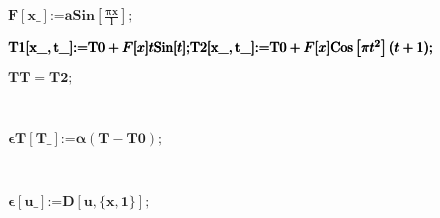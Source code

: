 \documentclass{article}
\newcommand{\unicode}[1]{{}}
\begin{document}
\begin{doublespace}
\noindent\(\pmb{\text{  }}\)
\end{doublespace}

\section*{$\unicode{041e}\unicode{043f}\unicode{0440}\unicode{0435}\unicode{0434}\unicode{0435}\unicode{043b}\unicode{0435}\unicode{043d}\unicode{0438}\unicode{0435}$
$\unicode{0432}\unicode{0441}\unicode{0435}\unicode{0445}$ $\unicode{043d}\unicode{0435}\unicode{043e}\unicode{0431}\unicode{0445}\unicode{043e}\unicode{0434}\unicode{0438}\unicode{043c}\unicode{044b}\unicode{0445}$
$\unicode{0444}\unicode{0443}\unicode{043d}\unicode{043a}\unicode{0446}\unicode{0438}\unicode{0439}$}

\begin{doublespace}
\noindent\(\pmb{F[\text{x$\_$}] \text{:=} a \text{Sin}\left[\frac{\pi  x}{l}\right];}\)
\end{doublespace}

\begin{doublespace}
\noindent\(\pmb{\text{T1}[\text{x$\_$}, \text{t$\_$}] \text{:=} \text{T0} + F[x]t \text{Sin}[t];}\\
\pmb{\text{T2}[ \text{x$\_$}, \text{t$\_$} ] \text{:=} \text{T0} + F[x] \text{Cos}\left[\pi  t^2\right](t+1);}\)
\end{doublespace}

\begin{doublespace}
\noindent\(\pmb{\text{TT} = \text{T2};}\)
\end{doublespace}

$\unicode{0422}\unicode{0435}\unicode{043f}\unicode{043b}\unicode{043e}\unicode{0432}\unicode{044b}\unicode{0435}$ $\unicode{0434}\unicode{0435}\unicode{0444}\unicode{043e}\unicode{0440}\unicode{043c}\unicode{0430}\unicode{0446}\unicode{0438}\unicode{0438}$

\begin{doublespace}
\noindent\(\pmb{\text{$\epsilon $T} [\text{T$\_$}] \text{:=} \alpha (T - \text{T0});}\)
\end{doublespace}

$\unicode{041f}\unicode{043e}\unicode{043b}\unicode{043d}\unicode{044b}\unicode{0435}$ $\unicode{0434}\unicode{0435}\unicode{0444}\unicode{043e}\unicode{0440}\unicode{043c}\unicode{0430}\unicode{0446}\unicode{0438}\unicode{0438}$

\begin{doublespace}
\noindent\(\pmb{\epsilon [\text{u$\_$}] \text{:=} D[u, \{x, 1\}];}\)
\end{doublespace}
\end{document}
